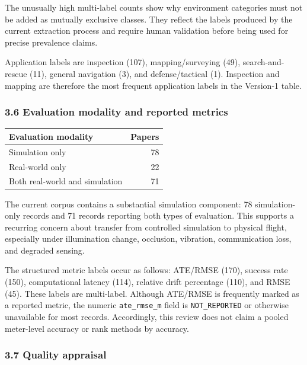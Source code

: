\documentclass[
  journal]{IEEEtran}
\newcounter{none} %
\begin{document}
The unusually high multi-label counts show why environment categories
must not be added as mutually exclusive classes. They reflect the labels
produced by the current extraction process and require human validation
before being used for precise prevalence claims.

Application labels are inspection (107), mapping/surveying (49),
search-and-rescue (11), general navigation (3), and defense/tactical
(1). Inspection and mapping are therefore the most frequent application
labels in the Version-1 table.

\subsubsection{3.6 Evaluation modality and reported
metrics}\label{36-evaluation-modality-and-reported-metrics}

{\def\LTcaptype{none} %
\begin{longtable}[]{@{}lr@{}}
\toprule\noalign{}
Evaluation modality & Papers \\
\midrule\noalign{}
\endhead
\bottomrule\noalign{}
\endlastfoot
Simulation only & 78 \\
Real-world only & 22 \\
Both real-world and simulation & 71 \\
\end{longtable}
}

The current corpus contains a substantial simulation component: 78
simulation-only records and 71 records reporting both types of
evaluation. This supports a recurring concern about transfer from
controlled simulation to physical flight, especially under illumination
change, occlusion, vibration, communication loss, and degraded sensing.

The structured metric labels occur as follows: ATE/RMSE (170), success
rate (150), computational latency (114), relative drift percentage
(110), and RMSE (45). These labels are multi-label. Although ATE/RMSE is
frequently marked as a reported metric, the numeric
\texttt{ate\_rmse\_m} field is \texttt{NOT\_REPORTED} or otherwise
unavailable for most records. Accordingly, this review does not claim a
pooled meter-level accuracy or rank methods by accuracy.

\subsubsection{3.7 Quality appraisal}\label{37-quality-appraisal}
\end{document}
